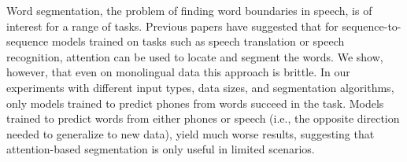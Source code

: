 Word segmentation, the problem of finding word boundaries in speech, is of interest for a range of tasks. Previous papers have suggested that for sequence-to-sequence models trained on tasks such as speech translation or speech recognition, attention can be used to locate and segment the words. We show, however, that even on monolingual data this approach is brittle. In our experiments with different input types, data sizes, and segmentation algorithms, only models trained to predict phones from words succeed in the task. Models trained to predict words from either phones or speech (i.e., the opposite direction needed to generalize to new data), yield much worse results, suggesting that attention-based segmentation is only useful in limited scenarios.
